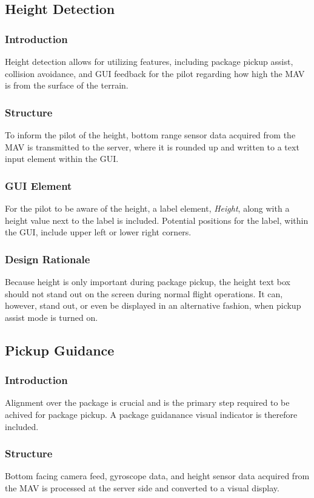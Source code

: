 \documentclass[onecolumn, draftclsnofoot, 10pt, compsoc]{IEEEtran}
\begin{document}
\subsection{Height Detection}
\subsubsection{Introduction}
Height detection allows for utilizing features, including package pickup assist, collision avoidance, and GUI feedback for the pilot regarding how high the MAV is from the surface of the terrain.

\subsubsection{Structure}
To inform the pilot of the height, bottom range sensor data acquired from the MAV is transmitted to the server, where it is rounded up and written to a text input element within the GUI.

\subsubsection{GUI Element}
For the pilot to be aware of the height, a label element, \textit{Height}, along with a height value next to the label is included. Potential positions for the label, within the GUI, include upper left or lower right corners.

\subsubsection{Design Rationale}
Because height is only important during package pickup, the height text box should not stand out on the screen during normal flight operations. It can, however, stand out, or even be displayed in an alternative fashion, when pickup assist mode is turned on.

\subsection{Pickup Guidance}
\subsubsection{Introduction}
Alignment over the package is crucial and is the primary step required to be achived for package pickup. A package guidanance visual indicator is therefore included.

\subsubsection{Structure}
Bottom facing camera feed, gyroscope data, and height sensor data acquired from the MAV is processed at the server side and converted to a visual display.
\end{document}
